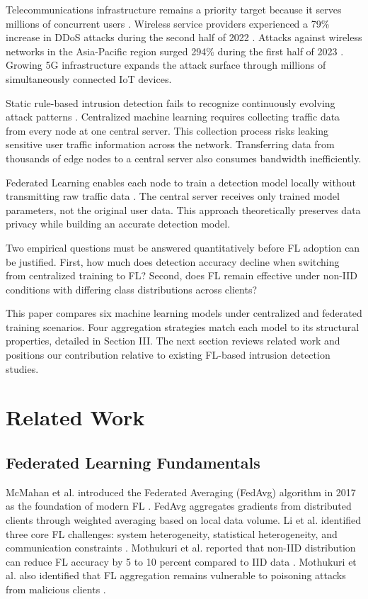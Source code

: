 \documentclass[conference, a4paper]{IEEEtran}
\begin{document}
Telecommunications infrastructure remains a priority target because it serves millions of concurrent users \cite{b2}. Wireless service providers experienced a 79\% increase in DDoS attacks during the second half of 2022 \cite{b2}. Attacks against wireless networks in the Asia-Pacific region surged 294\% during the first half of 2023 \cite{b2}. Growing 5G infrastructure expands the attack surface through millions of simultaneously connected IoT devices.

Static rule-based intrusion detection fails to recognize continuously evolving attack patterns \cite{b3}. Centralized machine learning requires collecting traffic data from every node at one central server. This collection process risks leaking sensitive user traffic information across the network. Transferring data from thousands of edge nodes to a central server also consumes bandwidth inefficiently.

Federated Learning enables each node to train a detection model locally without transmitting raw traffic data \cite{b4}. The central server receives only trained model parameters, not the original user data. This approach theoretically preserves data privacy while building an accurate detection model.

Two empirical questions must be answered quantitatively before FL adoption can be justified. First, how much does detection accuracy decline when switching from centralized training to FL? Second, does FL remain effective under non-IID conditions with differing class distributions across clients?

This paper compares six machine learning models under centralized and federated training scenarios. Four aggregation strategies match each model to its structural properties, detailed in Section III. The next section reviews related work and positions our contribution relative to existing FL-based intrusion detection studies.

\section{Related Work}

\subsection{Federated Learning Fundamentals}

McMahan et al. introduced the Federated Averaging (FedAvg) algorithm in 2017 as the foundation of modern FL \cite{b4}. FedAvg aggregates gradients from distributed clients through weighted averaging based on local data volume. Li et al. identified three core FL challenges: system heterogeneity, statistical heterogeneity, and communication constraints \cite{b5}. Mothukuri et al. reported that non-IID distribution can reduce FL accuracy by 5 to 10 percent compared to IID data \cite{b6}. Mothukuri et al. also identified that FL aggregation remains vulnerable to poisoning attacks from malicious clients \cite{b6}.
\end{document}

